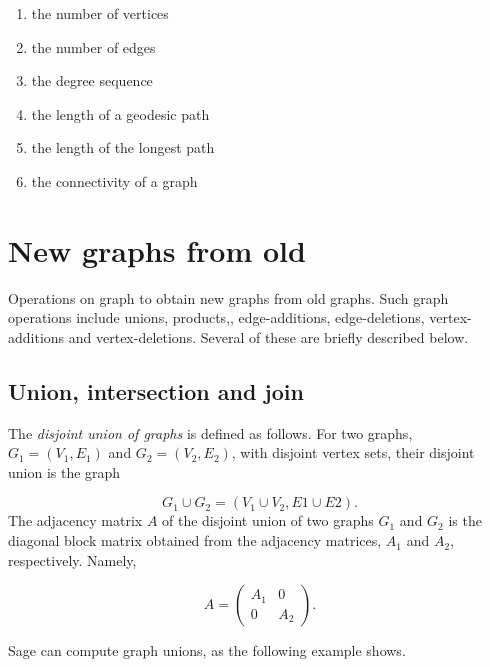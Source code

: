 \begin{enumerate}
\item the number of vertices

\item the number of edges

\item the degree sequence

\item the length of a geodesic path

\item the length of the longest path

\item the connectivity of a graph
\end{enumerate}



\section{New graphs from old}

Operations on graph to obtain new graphs from old graphs. Such graph
operations include unions, products,, edge-additions, edge-deletions, 
vertex-additions and vertex-deletions. Several of these are briefly
described below.



\subsection{Union, intersection and join}

The {\it disjoint union of graphs} is defined as follows. 
For two graphs, $G_1=(V_1,E_1)$ and $G_2=(V_2,E_2)$, with disjoint vertex sets,
their disjoint union is the graph 

\[
G_1\cup G_2 = (V_1 \cup V_2, E1 \cup E2).
\]
The adjacency matrix $A$ of the disjoint union of two 
graphs $G_1$ and $G_2$ is the diagonal block matrix obtained from
the adjacency matrices, $A_1$ and $A_2$, respectively.
Namely,

\[
A = \left(
\begin{array}{cc}
A_1 & 0 \\
0 & A_2
\end{array}
\right).
\]

Sage can compute graph unions, as the following example shows.

